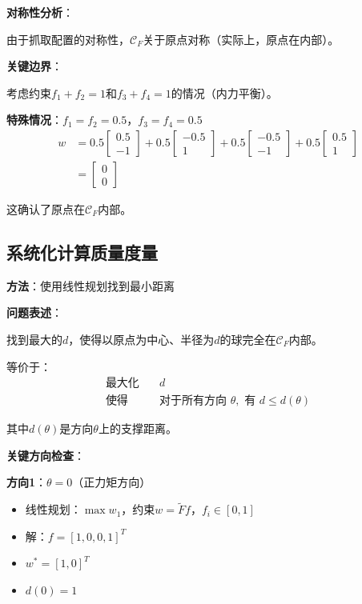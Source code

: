 \documentclass[12pt,a4paper]{article}
\begin{document}
\textbf{对称性分析}：

由于抓取配置的对称性，$\mathcal{C}_F$关于原点对称（实际上，原点在内部）。

\textbf{关键边界}：

考虑约束$f_1 + f_2 = 1$和$f_3 + f_4 = 1$的情况（内力平衡）。

\textbf{特殊情况}：$f_1 = f_2 = 0.5$，$f_3 = f_4 = 0.5$
\begin{align}
w &= 0.5 \begin{bmatrix} 0.5 \\ -1 \end{bmatrix} + 0.5 \begin{bmatrix} -0.5 \\ 1 \end{bmatrix} + 0.5 \begin{bmatrix} -0.5 \\ -1 \end{bmatrix} + 0.5 \begin{bmatrix} 0.5 \\ 1 \end{bmatrix} \\
&= \begin{bmatrix} 0 \\ 0 \end{bmatrix}
\end{align}

这确认了原点在$\mathcal{C}_F$内部。

\subsection{系统化计算质量度量}

\textbf{方法}：使用线性规划找到最小距离

\textbf{问题表述}：

找到最大的$d$，使得以原点为中心、半径为$d$的球完全在$\mathcal{C}_F$内部。

等价于：
\begin{align}
\text{最大化} \quad & d \\
\text{使得} \quad & \text{对于所有方向 } \theta, \text{ 有 } d \leq d(\theta)
\end{align}

其中$d(\theta)$是方向$\theta$上的支撑距离。

\textbf{关键方向检查}：

\textbf{方向1}：$\theta = 0$（正力矩方向）
\begin{itemize}
\item 线性规划：$\max w_1$，约束$w = \tilde{F} f$，$f_i \in [0,1]$
\item 解：$f = [1, 0, 0, 1]^T$
\item $w^* = [1, 0]^T$
\item $d(0) = 1$
\end{itemize}
\end{document}
